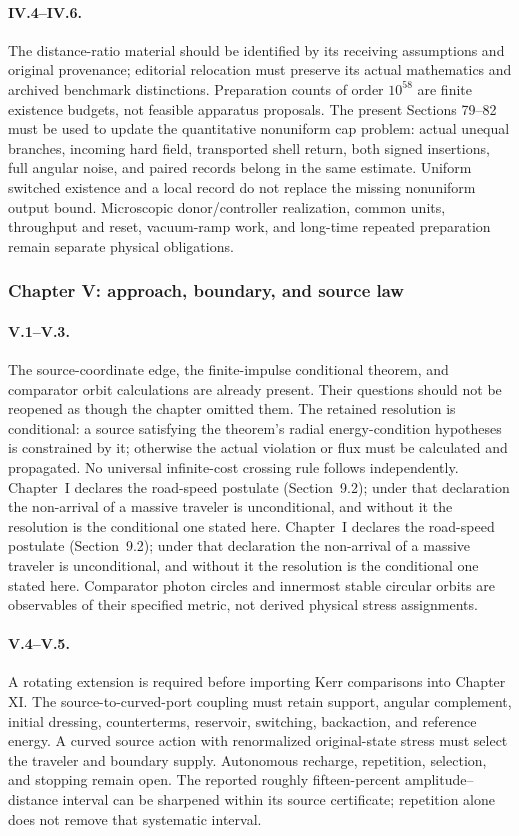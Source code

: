 \paragraph{IV.4--IV.6.}
The distance-ratio material should be identified by its receiving assumptions and original provenance; editorial relocation must preserve its actual mathematics and archived benchmark distinctions. Preparation counts of order $10^{58}$ are finite existence budgets, not feasible apparatus proposals. The present Sections 79--82 must be used to update the quantitative nonuniform cap problem: actual unequal branches, incoming hard field, transported shell return, both signed insertions, full angular noise, and paired records belong in the same estimate. Uniform switched existence and a local record do not replace the missing nonuniform output bound. Microscopic donor/controller realization, common units, throughput and reset, vacuum-ramp work, and long-time repeated preparation remain separate physical obligations.

\subsubsection*{Chapter V: approach, boundary, and source law}

\paragraph{V.1--V.3.}
The source-coordinate edge, the finite-impulse conditional theorem, and comparator orbit calculations are already present. Their questions should not be reopened as though the chapter omitted them. The retained resolution is conditional: a source satisfying the theorem's radial energy-condition hypotheses is constrained by it; otherwise the actual violation or flux must be calculated and propagated. No universal infinite-cost crossing rule follows independently. Chapter~I declares the road-speed postulate (Section~9.2); under that declaration the non-arrival of a massive traveler is unconditional, and without it the resolution is the conditional one stated here. Chapter~I declares the road-speed postulate (Section~9.2); under that declaration the non-arrival of a massive traveler is unconditional, and without it the resolution is the conditional one stated here. Comparator photon circles and innermost stable circular orbits are observables of their specified metric, not derived physical stress assignments.

\paragraph{V.4--V.5.}
A rotating extension is required before importing Kerr comparisons into Chapter XI. The source-to-curved-port coupling must retain support, angular complement, initial dressing, counterterms, reservoir, switching, backaction, and reference energy. A curved source action with renormalized original-state stress must select the traveler and boundary supply. Autonomous recharge, repetition, selection, and stopping remain open. The reported roughly fifteen-percent amplitude--distance interval can be sharpened within its source certificate; repetition alone does not remove that systematic interval.

